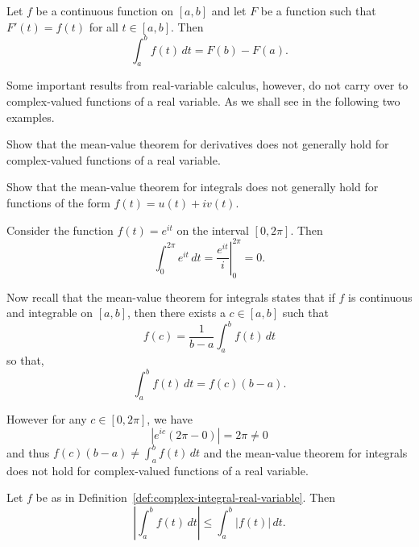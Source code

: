 \begin{theorem}
    Let \(f\) be a continuous function on \([a, b]\) and let \(F\) be a function such that \(F'(t) = f(t)\) for all \(t \in [a, b]\). Then
    \[
        \int_a^b f(t) \, dt = F(b) - F(a).
    \]
\end{theorem}

Some important results from real-variable calculus, however, do not carry over to complex-valued functions of a real variable. As we shall see in the following two examples.

\begin{example}
    Show that the mean-value theorem for derivatives does not generally hold for complex-valued functions of a real variable.

    \begin{solution}
        
    \end{solution}
\end{example}

\begin{example}
    Show that the mean-value theorem for integrals does not generally hold for functions of the form \(f(t) = u(t) + iv(t)\).

    \begin{solution}
        Consider the function \(f(t) = e^{it}\) on the interval \([0, 2\pi]\). Then
        \[
            \int_0^{2\pi} e^{it} \, dt = \left. \frac{e^{it}}{i} \right|_0^{2\pi} = 0.
        \]

        Now recall that the mean-value theorem for integrals states that if \(f\) is continuous and integrable on \([a, b]\), then there exists a \(c \in [a, b]\) such that
        \[
            f(c) = \frac{1}{b-a} \int_a^b f(t) \, dt
        \]
        so that,
        \[
            \int_a^b f(t) \, dt = f(c)(b-a).
        \]

        However for any \(c \in [0, 2\pi]\), we have
        \[
            |e^{ic}(2\pi - 0) | = 2\pi \neq 0
        \]
        and thus \(f(c)(b - a) \neq \int_a^b f(t) \, dt\) and the mean-value theorem for integrals does not hold for complex-valued functions of a real variable.
    \end{solution}
\end{example}


\begin{theorem}
    Let \(f\) be as in Definition~\ref{def:complex-integral-real-variable}. Then
    \[
        \left| \int_a^b f(t) \, dt \right| \leq \int_a^b |f(t)| \, dt.
    \]
    \label{thm:modulus-integral-inequality}
\end{theorem}

